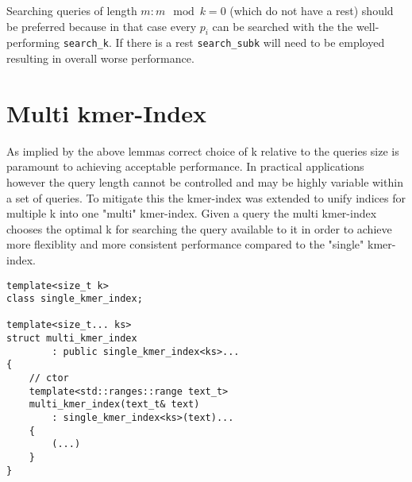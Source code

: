 Searching queries of length $m:m\mod k=0$ (which do not have a rest)
should be preferred because in that case every $p_{i}$ can be searched with the the well-performing \lstinline{search_k}.
If there is a rest \lstinline{search_subk} will need to be employed resulting in overall worse performance.

\section{Multi kmer-Index}

As implied by the above lemmas correct choice of k relative to the queries size is paramount to achieving acceptable
performance. In practical applications however the query length cannot be controlled and may be highly variable within
a set of queries. To mitigate this the kmer-index was extended to unify indices for multiple k
into one "multi" kmer-index. Given a query the multi kmer-index chooses the optimal k for searching the query available
to it in order to achieve more flexiblity and more consistent performance compared to the "single" kmer-index.

\begin{lstlisting}[caption={Class definition and constructor implementation of the (multi) kmer-index.},language={[GNU]C++},tabsize=2]
template<size_t k>
class single_kmer_index;

template<size_t... ks>
struct multi_kmer_index
        : public single_kmer_index<ks>...
{
	// ctor
	template<std::ranges::range text_t>
	multi_kmer_index(text_t& text)
		: single_kmer_index<ks>(text)...
	{
		(...)
	}
}

\end{lstlisting}
